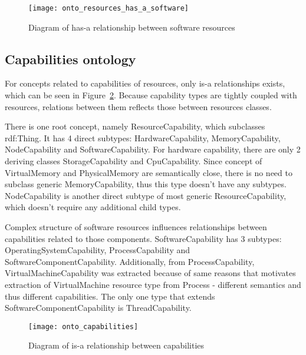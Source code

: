 \begin{figure}[ht]
  \centering
  \texttt{[image: onto\_resources\_has\_a\_software]}
  \caption{Diagram of has-a relationship between software resources}
  \label{fig:onto_resources_has_a_software}
\end{figure}

\pagebreak

\subsection{Capabilities ontology}
\label{subsec:arch_knowledge_capabilitie}

For concepts related to capabilities of resources, only is-a relationships exists, which can be seen in
Figure~\ref{fig:onto_capabilities}. Because capability types are tightly coupled with resources, relations between them
reflects those between resources classes. 

There is one root concept, namely ResourceCapability, which subclasses rdf:Thing. It has 4 direct subtypes:
HardwareCapability, MemoryCapability, NodeCapability and SoftwareCapability. For hardware capability, there are only 2
deriving classes StorageCapability and CpuCapability. Since concept of VirtualMemory and PhysicalMemory are semantically
close, there is no need to subclass generic MemoryCapability, thus this type doesn't have any subtypes. NodeCapability
is another direct subtype of most generic ResourceCapability, which doesn't require any additional child types. 

Complex structure of software resources influences relationships between capabilities related to those components.
SoftwareCapability has 3 subtypes: OperatingSystemCapability, ProcessCapability and SoftwareComponentCapability.
Additionally, from ProcessCapability, VirtualMachineCapability was extracted because of same reasons that motivates
extraction of VirtualMachine resource type from Process - different semantics and thus different capabilities. The only
one type that extends SoftwareComponentCapability is ThreadCapability.


\begin{figure}[ht]
  \centering
  \texttt{[image: onto\_capabilities]}
  \caption{Diagram of is-a relationship between capabilities}
  \label{fig:onto_capabilities}
\end{figure}






